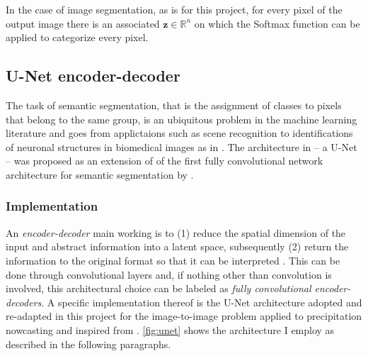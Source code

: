 In the case of image segmentation, as is for this project, for every pixel of the output image there is an associated $\bm{z} \in \mathbb{R}^n$ on which the Softmax function can be applied to categorize every pixel.

%
\subsection{U-Net encoder-decoder}\label{sec:Unet}
The task of semantic segmentation, that is the assignment of classes to pixels that belong to the same group, is an ubiquitous problem in the machine learning literature and goes from applictaions such as scene recognition \citep{Badrinarayanan2017SegNet:Segmentation} to identifications of neuronal structures in biomedical images as in \citet{Ronneberger2015U-Net:Segmentation}. The architecture in \citet{Ronneberger2015U-Net:Segmentation} -- a U-Net -- was proposed as an extension of  of the first fully convolutional network architecture for semantic segmentation by \citet{Shelhamer2017FullySegmentation}. 

\subsubsection{Implementation}

An \textit{encoder-decoder} main working is to (1) reduce the spatial dimension of the input and abstract information into a latent space, subsequently (2) return the information to the original format so that it can be interpreted \citep{Goodfellow2016}. This can be done through convolutional layers and, if nothing other than convolution is involved, this architectural choice can be labeled as \textit{fully convolutional encoder-decoders}. A specific implementation thereof is the U-Net architecture \citep{Ronneberger2015U-Net:Segmentation} adopted and re-adapted in this project for the image-to-image problem applied to precipitation nowcasting and inspired from \citet{Agrawal2019MachineImages}. \cref{fig:unet} shows the architecture I employ as described in the following paragraphs.

